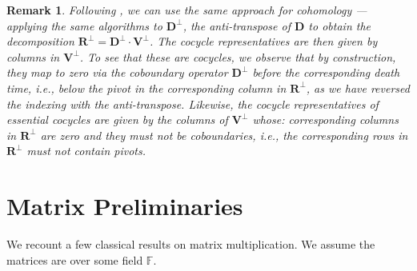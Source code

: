 \documentclass{article}
\newtheorem{remark}[theorem]{Remark}
\newcommand{\field}{\mathbb{F}}
\newcommand{\mat}[1]{\mathbf{#1}}
\newcommand{\Remark}[1]{\textcolor{blue}{[#1]}}
\begin{document}
\begin{remark} Following \cite{de2011dualities}, we can use the same approach for cohomology --- applying the same algorithms to $\mat{D}^{\perp
}$, the anti-transpose of $\mat{D}$ to obtain the decomposition $\mat{R}^{\perp
} = \mat{D}^{\perp}\cdot \mat{V}^{\perp
} $. The cocycle representatives are then given by columns in  $\mat{V}^{\perp}$. To see that these are cocycles, we observe that by construction, they map to zero via the coboundary operator $\mat{D}^{\perp
    }$ before the corresponding death time, i.e., below the pivot in the corresponding column in $\mat{R}^{\perp}$, as we have reversed the indexing with the anti-transpose. Likewise, the cocycle representatives of essential cocycles are given by the columns of $\mat{V}^{\perp}$ whose: corresponding columns in $\mat{R}^{\perp}$ are zero \emph{and} they must not be coboundaries, i.e., the corresponding rows in $\mat{R}^{\perp}$ must not contain pivots.
\end{remark}
\section{Matrix Preliminaries}
We recount a few classical results on matrix multiplication.  We assume the
matrices are over some field $\field$.
\end{document}
